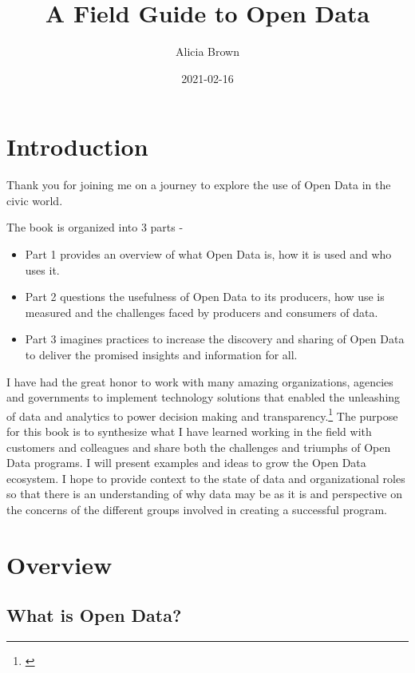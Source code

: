 \documentclass[
  openany]{book}
\title{A Field Guide to Open Data}
\author{Alicia Brown}
\date{2021-02-16}
\providecommand{\tightlist}{%
  \setlength{\itemsep}{0pt}\setlength{\parskip}{0pt}}
\begin{document}
\maketitle

{
\setcounter{tocdepth}{1}
\tableofcontents
}
\hypertarget{introduction}{%
\chapter{Introduction}\label{introduction}}

Thank you for joining me on a journey to explore the use of Open Data in the civic world.

The book is organized into 3 parts -

\begin{itemize}
\tightlist
\item
  Part 1 provides an overview of what Open Data is, how it is used and who uses it.
\item
  Part 2 questions the usefulness of Open Data to its producers, how use is measured and the challenges faced by producers and consumers of data.
\item
  Part 3 imagines practices to increase the discovery and sharing of Open Data to deliver the promised insights and information for all.
\end{itemize}

I have had the great honor to work with many amazing organizations, agencies and governments to implement technology solutions that enabled the unleashing of data and analytics to power decision making and transparency.\footnote{\citet{blog5years}} The purpose for this book is to synthesize what I have learned working in the field with customers and colleagues and share both the challenges and triumphs of Open Data programs. I will present examples and ideas to grow the Open Data ecosystem. I hope to provide context to the state of data and organizational roles so that there is an understanding of why data may be as it is and perspective on the concerns of the different groups involved in creating a successful program.

\hypertarget{overview}{%
\chapter{Overview}\label{overview}}

\hypertarget{what-is-open-data}{%
\section{What is Open Data?}\label{what-is-open-data}}
\end{document}
